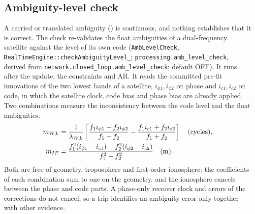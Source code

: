 \documentclass[main.tex]{subfiles}
\begin{document}
\subsection{Ambiguity-level check}\label{sec:rt-amblevel}

A carried or translated ambiguity () is continuous, and nothing establishes that it is correct.  The
check re-validates the float ambiguities of a dual-frequency satellite against
the level of its own code (\texttt{AmbLevelCheck},
\texttt{RealTimeEngine::checkAmbiguityLevel\_};
\texttt{processing.amb\_level\_check}, derived from
\texttt{network.closed\_loop.amb\_level\_check}; default OFF).  It runs after the
update, the constraints and AR.  It reads the committed pre-fit innovations of
the two lowest bands of a satellite, $i_{\phi1}, i_{\phi2}$ on phase and
$i_{c1}, i_{c2}$ on code, in which the satellite clock, code bias and phase bias
are already applied.  Two combinations measure the inconsistency between the code
level and the float ambiguities:
\begin{align}
m_{WL} &= \frac{1}{\lambda_{WL}}\left[
  \frac{f_1 i_{\phi1} - f_2 i_{\phi2}}{f_1 - f_2}
  - \frac{f_1 i_{c1} + f_2 i_{c2}}{f_1 + f_2}\right]
  \quad\text{(cycles)},
\label{eq:rt-level-wl}\\
m_{IF} &= \frac{f_1^{2}(i_{\phi1} - i_{c1})
  - f_2^{2}(i_{\phi2} - i_{c2})}{f_1^{2} - f_2^{2}}
  \quad\text{(m)}.
\label{eq:rt-level-if}
\end{align}
Both are free of geometry, troposphere and first-order ionosphere: the
coefficients of each combination sum to one on the geometry, and the
ionosphere cancels between the phase and code parts.  A phase-only receiver
clock and errors of the corrections do not cancel, so a trip identifies an
ambiguity error only together with other evidence.
\end{document}
